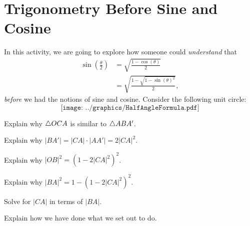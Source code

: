 \newpage
\section{Trigonometry Before Sine and Cosine}	

In this activity, we are going to explore how someone could \textit{understand} that 
\begin{align*}
\sin\left(\frac{\theta}{2}\right) &= \sqrt{\frac{1-\cos(\theta)}{2}}\\
&=\sqrt{\frac{1 - \sqrt{1 - \sin(\theta)^2}}{2}},
\end{align*}
\textit{before} we had the notions of sine and cosine. Consider the following unit circle:
\[
\texttt{[image: ../graphics/HalfAngleFormula.pdf]}
\]


\begin{prob} 
Explain why $\triangle OCA$ is similar to $\triangle ABA'$.
\end{prob}

\begin{prob} 
Explain why $|BA'| = |CA|\cdot |AA'| = 2|CA|^2$.
\end{prob}

\begin{prob} 
Explain why $|OB|^2 = (1-2|CA|^2)^2$.
\end{prob}

\begin{prob} 
Explain why $|BA|^2 = 1-(1-2|CA|^2)^2$.
\end{prob}


\begin{prob} Solve for $|CA|$ in terms of $|BA|$.
\end{prob}

\begin{prob}
Explain how we have done what we set out to do.
\end{prob}
